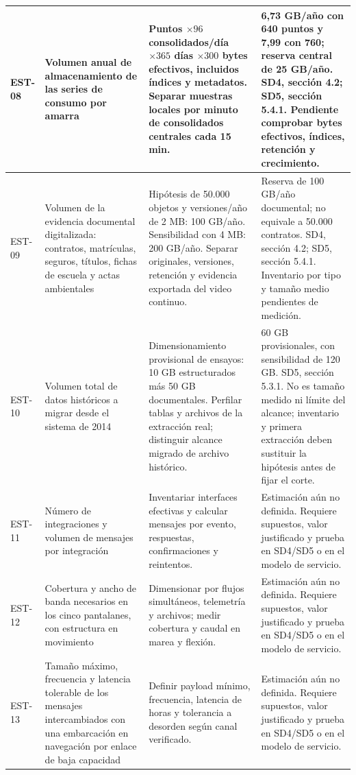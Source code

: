 \begin{longtable}{|L{0.075697\AnchoTablaAnexo}|L{0.270000\AnchoTablaAnexo}|L{0.340000\AnchoTablaAnexo}|L{0.314303\AnchoTablaAnexo}|}
EST-08 & Volumen anual de almacenamiento de las series de consumo por amarra & Puntos \(\times96\) consolidados/día \(\times365\) días \(\times300\) bytes efectivos, incluidos índices y metadatos. Separar muestras locales por minuto de consolidados centrales cada 15 min. & 6,73 GB/año con 640 puntos y 7,99 con 760; reserva central de 25 GB/año. SD4, sección 4.2; SD5, sección 5.4.1. Pendiente comprobar bytes efectivos, índices, retención y crecimiento. \\ \hline
{}
EST-09 & Volumen de la evidencia documental digitalizada: contratos, matrículas, seguros, títulos, fichas de escuela y actas ambientales & Hipótesis de 50.000 objetos y versiones/año de 2 MB: 100 GB/año. Sensibilidad con 4 MB: 200 GB/año. Separar originales, versiones, retención y evidencia exportada del video continuo. & Reserva de 100 GB/año documental; no equivale a 50.000 contratos. SD4, sección 4.2; SD5, sección 5.4.1. Inventario por tipo y tamaño medio pendientes de medición. \\ \hline
EST-10 & Volumen total de datos históricos a migrar desde el sistema de 2014 & Dimensionamiento provisional de ensayos: 10 GB estructurados más 50 GB documentales. Perfilar tablas y archivos de la extracción real; distinguir alcance migrado de archivo histórico. & 60 GB provisionales, con sensibilidad de 120 GB. SD5, sección 5.3.1. No es tamaño medido ni límite del alcance; inventario y primera extracción deben sustituir la hipótesis antes de fijar el corte. \\ \hline
{}
EST-11 & Número de integraciones y volumen de mensajes por integración & Inventariar interfaces efectivas y calcular mensajes por evento, respuestas, confirmaciones y reintentos. & Estimación aún no definida. Requiere supuestos, valor justificado y prueba en SD4/SD5 o en el modelo de servicio. \\ \hline
EST-12 & Cobertura y ancho de banda necesarios en los cinco pantalanes, con estructura en movimiento & Dimensionar por flujos simultáneos, telemetría y archivos; medir cobertura y caudal en marea y flexión. & Estimación aún no definida. Requiere supuestos, valor justificado y prueba en SD4/SD5 o en el modelo de servicio. \\ \hline
{}
EST-13 & Tamaño máximo, frecuencia y latencia tolerable de los mensajes intercambiados con una embarcación en navegación por enlace de baja capacidad & Definir payload mínimo, frecuencia, latencia de horas y tolerancia a desorden según canal verificado. & Estimación aún no definida. Requiere supuestos, valor justificado y prueba en SD4/SD5 o en el modelo de servicio. \\ \hline

\end{longtable}
